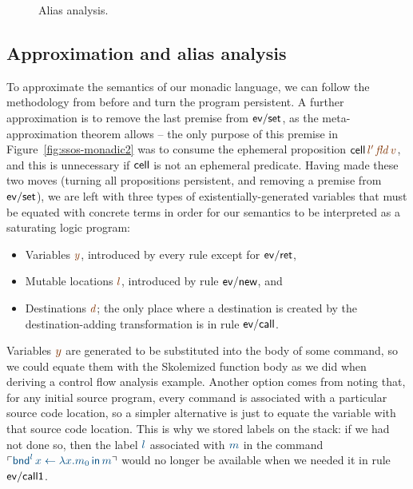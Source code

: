 \begin{figure}
\caption{Alias analysis.}
\label{fig:ssos-monadic-approx}
\end{figure}



\subsection{Approximation and alias analysis}


To approximate the semantics of our monadic language, we can follow the
methodology from before and turn the program persistent. A further
approximation is to remove the last premise from ${\sf ev/set}$, as
the meta-approximation theorem allows -- the only purpose of this
premise in Figure~\ref{fig:ssos-monadic2} was to consume the ephemeral
proposition ${\sf cell}\,\lf{l'}\,\lf{\it fld}\,\lf{v}$, and this is unnecessary
if ${\sf cell}$ is not an ephemeral predicate.  Having
made these two moves (turning all propositions persistent, and removing
a premise from ${\sf ev/set}$), we are left with three types of
existentially-generated variables that must be equated with concrete
terms in order for our semantics to be interpreted as a saturating
logic program:

\smallskip
\begin{itemize}
\item Variables $\lf{y}$, introduced by every rule except for ${\sf ev/ret}$,
\item Mutable locations $\lf{l}$, introduced by rule ${\sf ev/new}$, and 
\item Destinations $\lf{d}$; the only place where a destination is created
by the destination-adding transformation is in rule ${\sf ev/call}$.
\end{itemize}
\smallskip

Variables $\lf{y}$ are generated to be substituted into the body of some
command, so we could equate them with the Skolemized function body as
we did when deriving a control flow analysis example. Another option
comes from noting that, for any initial source program, every command
is associated with a particular source code location, so a simpler
alternative is just to equate the variable with that source code
location. This is why we stored labels on the stack: if we had not
done so, then the label $\obj{l}$ associated with $\obj{m}$ in the command
$\interp{{\sf bnd}^l\, x \leftarrow \lambda x.m_0 \,{\sf in}\,m}$ would
no longer be available when we needed it in rule ${\sf ev/call1}$.

